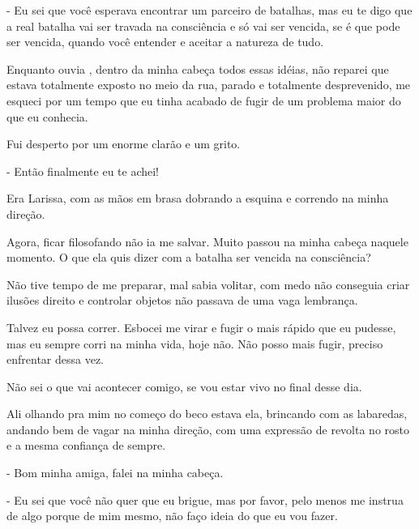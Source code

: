 - Eu sei que você esperava encontrar um parceiro de batalhas, mas eu te digo que a real batalha vai ser travada na consciência e só vai ser vencida, se é que pode ser vencida, quando você entender e aceitar a natureza de tudo.

Enquanto ouvia , dentro da minha cabeça todos essas idéias, não reparei que estava totalmente exposto no meio da rua, parado e totalmente desprevenido, me esqueci por um tempo que eu tinha acabado de fugir de um problema maior do que eu conhecia.

Fui desperto por um enorme clarão e um grito.

- Então finalmente eu te achei!

Era Larissa, com as mãos em brasa dobrando a esquina e correndo na minha direção.

Agora, ficar filosofando não ia me salvar. Muito passou na minha cabeça naquele momento. O que ela quis dizer com a batalha ser vencida na consciência?

Não tive tempo de me preparar, mal sabia volitar, com medo não conseguia criar ilusões direito e controlar objetos não passava de uma vaga lembrança.

Talvez eu possa correr. Esbocei me virar e fugir o mais rápido que eu pudesse, mas eu sempre corri na minha vida, hoje não. Não posso mais fugir, preciso enfrentar dessa vez.

Não sei o que vai acontecer comigo, se vou estar vivo no final desse dia.

Ali olhando pra mim no começo do beco estava ela, brincando com as labaredas, andando bem de vagar na minha direção, com uma expressão de revolta no rosto e a mesma confiança de sempre.

- Bom minha amiga, falei na minha cabeça.

- Eu sei que você não quer que eu brigue, mas por favor, pelo menos me instrua de algo porque de mim mesmo, não faço ideia do que eu vou fazer.